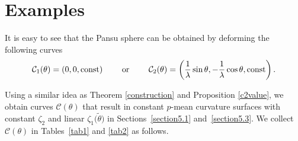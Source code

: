 \documentclass[10pt,a4paper]{amsart}
\numberwithin{equation}{section}
\begin{document}
\section{Examples}\label{examples}

It is easy to see that the Pansu sphere can be obtained by deforming the following curves
\[
\mathcal{C}_1(\theta)=(0,0,\text{\rm const}) \qquad\text{ or }\qquad \mathcal{C}_2(\theta)=\left(\frac{1
}{\lambda}\sin{\theta},-\frac{1}{\lambda}\cos{\theta},\text{\rm const}\right).
\]

Using a similar idea as Theorem \ref{construction} and Proposition \ref{c2value}, we obtain curves $\mathcal{C}(\theta)$ that result in constant $p$-mean curvature surfaces with
constant $\zeta_2$ and linear $\zeta_1\bigl(\tilde \theta\bigr)$ in Sections~\ref{section5.1} and~\ref{section5.3}. We collect $\mathcal C(\theta)$ in Tables~\ref{tab1} and \ref{tab2} as follows.
\end{document}
